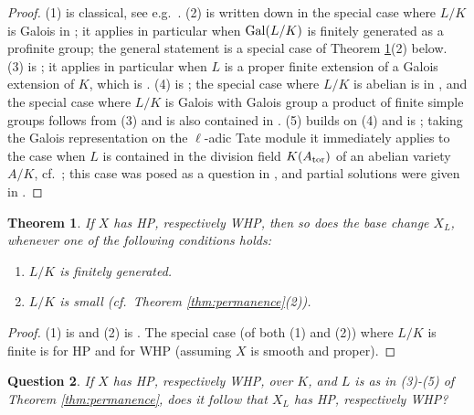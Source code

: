 \documentclass[10pt,a4paper]{amsart}
\theoremstyle{plain}
\newtheorem{theorem}{Theorem}
\newtheorem{question}[theorem]{Question}
\theoremstyle{remark}
\numberwithin{theorem}{section}
\begin{document}
\begin{proof}
(1) is classical, see e.g.~\cite[Propositions 12.3.3 and 13.2.1]{FJ}.
(2) is written down in the special case where $L/K$ is Galois in \cite[Proposition 16.11.1]{FJ};
it applies in particular when ${\rm Gal}(L/K)$ is finitely generated as a profinite group;
the general statement is a special case of Theorem \ref{thm:base_change}(2) below.
(3) is \cite[Theorem 4.1]{Haran}; 
it applies in particular when $L$ is a proper finite extension of a Galois extension of $K$, which is \cite[Satz 9.7]{Weissauer}.
(4) is \cite[Theorem 1.1]{BFW}; the special case where $L/K$ is abelian is in \cite{Kuyk},
and the special case where $L/K$ is Galois with Galois group a product of finite simple groups follows from (3)
and is also contained in \cite{Kuyk}.
(5) builds on (4) and is \cite[Theorem 1.2]{BFW}; 
taking the Galois representation on the $\ell$-adic Tate module it immediately applies to the case when $L$ is contained in the division field $K(A_{\rm tor})$ of an abelian variety $A/K$, cf.~\cite[Theorem 1.3]{BFW}; this case was posed as a question in \cite{Jarden}, and partial solutions were given
in \cite{Jarden, FJP,Thornhill}.
\end{proof}
    



\begin{theorem}\label{thm:base_change}
If $X$ has HP, respectively WHP, then so does the base change $X_L$,
whenever one of the following conditions holds:
\begin{enumerate}
    \item $L/K$ is finitely generated.
    \item $L/K$ is small (cf.~Theorem \ref{thm:permanence}(2)).
\end{enumerate}   
\end{theorem}

\begin{proof}
(1) is \cite[Corollary 3.3]{BFP24} and (2) is \cite[Corollary 4.3]{BFP24}.
The special case (of both (1) and (2)) where $L/K$ is finite is \cite[Corollary 3.2.2]{Serre} for HP
and \cite[Proposition 3.15]{CDJLZ} for WHP (assuming $X$ is smooth and proper).
\end{proof}

\begin{question}
If $X$ has HP, respectively WHP, over $K$,
and $L$ is as in (3)-(5) of Theorem \ref{thm:permanence}, does it follow that
$X_L$ has HP, respectively WHP?
\end{question}
\end{document}
